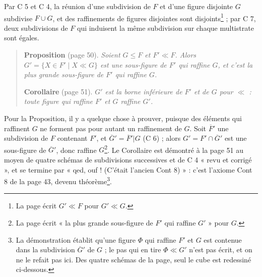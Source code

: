 \documentclass[11pt,a4paper]{article}
\begin{document}
Par C 5 et C 4, la réunion d'une subdivision de $F$ et d'une figure disjointe
$G$ subdivise $F \cup G$, et des raffinements de figures disjointes sont
disjoints\footnote{La page écrit $G' \ll F$ pour $G' \ll G$.} ; par C 7, deux
subdivisions de $F$ qui induisent la même subdivision sur chaque multistrate
sont égales.

\begin{quote}
\textbf{Proposition} (page 50). \emph{Soient $G \leq F$ et $F' \ll F$. Alors
$G' = \{X \in F' \mid X \ll G\}$ est une sous-figure de $F'$ qui raffine $G$,
et c'est la plus grande sous-figure de $F'$ qui raffine $G$.}

\textbf{Corollaire} (page 51). \emph{$G'$ est la borne inférieure de $F'$ et
de $G$ pour $\ll$ : toute figure qui raffine $F'$ et $G$ raffine $G'$.}
\end{quote}

Pour la Proposition, il y a quelque chose à prouver, puisque des éléments qui
raffinent $G$ ne forment pas pour autant un raffinement de $G$. Soit
$\overline{F}'$ une subdivision de $F$ contenant $F'$, et $\overline{G}' =
\overline{F}'|G$ (C 6) ; alors $G' = F' \cap \overline{G}'$ est une
sous-figure de $\overline{G}'$, donc raffine $G$\footnote{La page écrit « la plus
grande sous-figure de $F'$ qui raffine $G'$ » pour $G$.}. Le Corollaire est
démontré à la page 51 au moyen de quatre schémas de subdivisions successives
et de C 4 « revu et corrigé », et se termine par « qed, ouf ! (C'était
l'ancien Cont 8) » : c'est l'axiome Cont 8 de la page 43, devenu
théorème\footnote{La démonstration établit qu'une figure $\Phi$ qui raffine
$F'$ et $G$ est contenue dans la subdivision $\overline{G}'$ de $G$ ; le pas
qui en tire $\Phi \ll G'$ n'est pas écrit, et on ne le refait pas ici. Des quatre
schémas de la page, seul le cube est redessiné ci-dessous.}.
\end{document}
